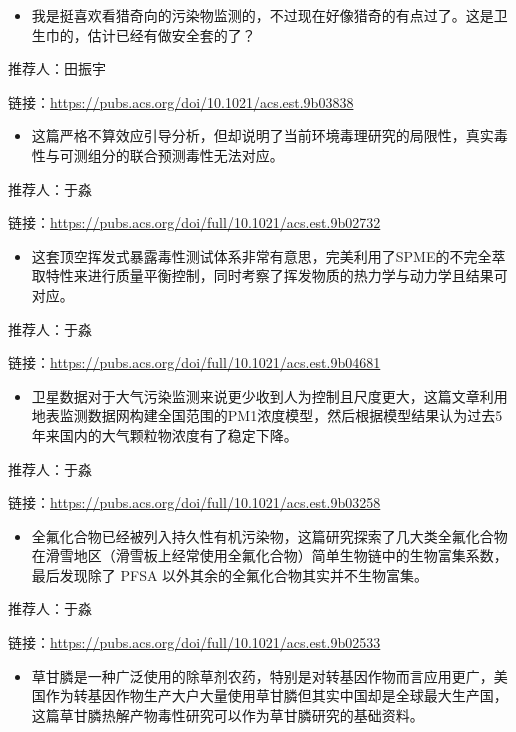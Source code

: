 \documentclass[]{book}
\providecommand{\tightlist}{%
  \setlength{\itemsep}{0pt}\setlength{\parskip}{0pt}}
\begin{document}
\begin{itemize}
\tightlist
\item
  我是挺喜欢看猎奇向的污染物监测的，不过现在好像猎奇的有点过了。这是卫生巾的，估计已经有做安全套的了？
\end{itemize}

推荐人：田振宇

链接：\url{https://pubs.acs.org/doi/10.1021/acs.est.9b03838}

\begin{itemize}
\tightlist
\item
  这篇严格不算效应引导分析，但却说明了当前环境毒理研究的局限性，真实毒性与可测组分的联合预测毒性无法对应。
\end{itemize}

推荐人：于淼

链接：\url{https://pubs.acs.org/doi/full/10.1021/acs.est.9b02732}

\begin{itemize}
\tightlist
\item
  这套顶空挥发式暴露毒性测试体系非常有意思，完美利用了SPME的不完全萃取特性来进行质量平衡控制，同时考察了挥发物质的热力学与动力学且结果可对应。
\end{itemize}

推荐人：于淼

链接：\url{https://pubs.acs.org/doi/full/10.1021/acs.est.9b04681}

\begin{itemize}
\tightlist
\item
  卫星数据对于大气污染监测来说更少收到人为控制且尺度更大，这篇文章利用地表监测数据网构建全国范围的PM1浓度模型，然后根据模型结果认为过去5年来国内的大气颗粒物浓度有了稳定下降。
\end{itemize}

推荐人：于淼

链接：\url{https://pubs.acs.org/doi/full/10.1021/acs.est.9b03258}

\begin{itemize}
\tightlist
\item
  全氟化合物已经被列入持久性有机污染物，这篇研究探索了几大类全氟化合物在滑雪地区（滑雪板上经常使用全氟化合物）简单生物链中的生物富集系数，最后发现除了 PFSA 以外其余的全氟化合物其实并不生物富集。
\end{itemize}

推荐人：于淼

链接：\url{https://pubs.acs.org/doi/full/10.1021/acs.est.9b02533}

\begin{itemize}
\tightlist
\item
  草甘膦是一种广泛使用的除草剂农药，特别是对转基因作物而言应用更广，美国作为转基因作物生产大户大量使用草甘膦但其实中国却是全球最大生产国，这篇草甘膦热解产物毒性研究可以作为草甘膦研究的基础资料。
\end{itemize}
\end{document}
